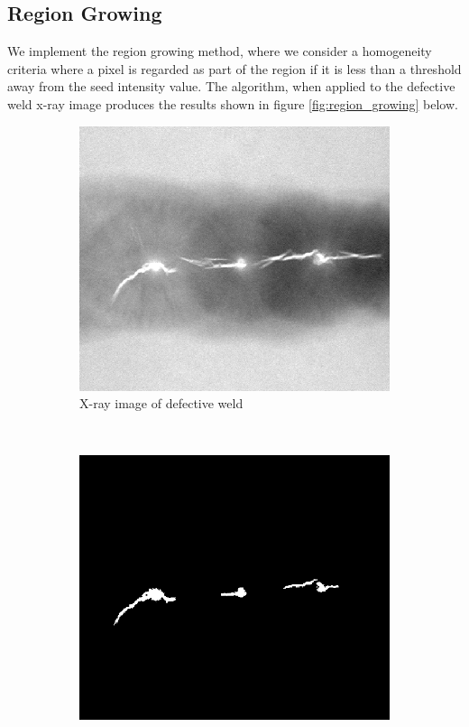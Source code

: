 \documentclass[]{article}
\begin{document}
\subsection{Region Growing}
We implement the region growing method, where we consider a homogeneity criteria where a pixel is regarded as part of the region if it is less than a threshold away from the seed intensity value. The algorithm, when applied to the defective weld x-ray image produces the results shown in figure \ref{fig:region_growing} below.

\begin{figure}[H]
    \centering
    \begin{subfigure}{0.5\textwidth}
        \centering
        \includegraphics[width=\textwidth]{img/before/defective-weld}
        \caption{X-ray image of defective weld}
    \end{subfigure}%
    ~
    \begin{subfigure}{0.5\textwidth}
        \centering
        \includegraphics[width=\textwidth]{img/defective-weld-segmented}

\end{subfigure}
\end{figure}
\end{document}
